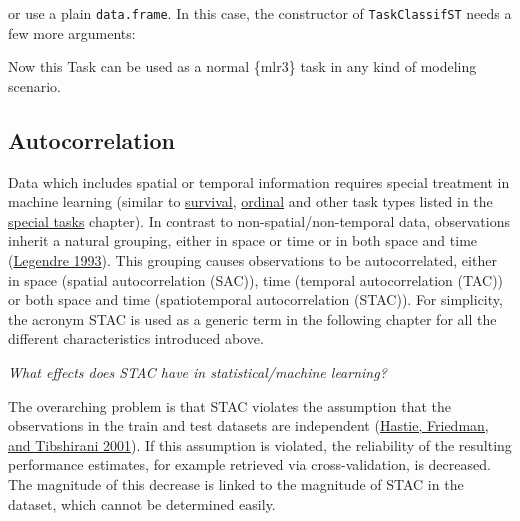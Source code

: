 \documentclass[
]{scrbook}
\newenvironment{Shaded}{\begin{snugshade}}{\end{snugshade}}
\newcommand{\AttributeTok}[1]{\textcolor[rgb]{0.77,0.63,0.00}{#1}}
\newcommand{\DecValTok}[1]{\textcolor[rgb]{0.00,0.00,0.81}{#1}}
\newcommand{\FunctionTok}[1]{\textcolor[rgb]{0.00,0.00,0.00}{#1}}
\newcommand{\NormalTok}[1]{#1}
\newcommand{\OtherTok}[1]{\textcolor[rgb]{0.56,0.35,0.01}{#1}}
\newcommand{\SpecialCharTok}[1]{\textcolor[rgb]{0.00,0.00,0.00}{#1}}
\newcommand{\StringTok}[1]{\textcolor[rgb]{0.31,0.60,0.02}{#1}}
\renewenvironment{Shaded} {\begin{snugshade}\small} {\end{snugshade}}
\begin{document}
or use a plain \texttt{data.frame}.
In this case, the constructor of \texttt{TaskClassifST} needs a few more arguments:

\begin{Shaded}
\end{Shaded}

Now this Task can be used as a normal \{mlr3\} task in any kind of modeling scenario.

\hypertarget{spatiotemporal-intro}{%
\subsection{Autocorrelation}\label{spatiotemporal-intro}}

Data which includes spatial or temporal information requires special treatment in machine learning (similar to \protect\hyperlink{survival}{survival}, \protect\hyperlink{ordinal}{ordinal} and other task types listed in the \protect\hyperlink{special-tasks}{special tasks} chapter).
In contrast to non-spatial/non-temporal data, observations inherit a natural grouping, either in space or time or in both space and time (\protect\hyperlink{ref-legendre1993}{Legendre 1993}).
This grouping causes observations to be autocorrelated, either in space (spatial autocorrelation (SAC)), time (temporal autocorrelation (TAC)) or both space and time (spatiotemporal autocorrelation (STAC)).
For simplicity, the acronym STAC is used as a generic term in the following chapter for all the different characteristics introduced above.

\emph{What effects does STAC have in statistical/machine learning?}

The overarching problem is that STAC violates the assumption that the observations in the train and test datasets are independent (\protect\hyperlink{ref-hastie2001}{Hastie, Friedman, and Tibshirani 2001}).
If this assumption is violated, the reliability of the resulting performance estimates, for example retrieved via cross-validation, is decreased.
The magnitude of this decrease is linked to the magnitude of STAC in the dataset, which cannot be determined easily.
\end{document}
